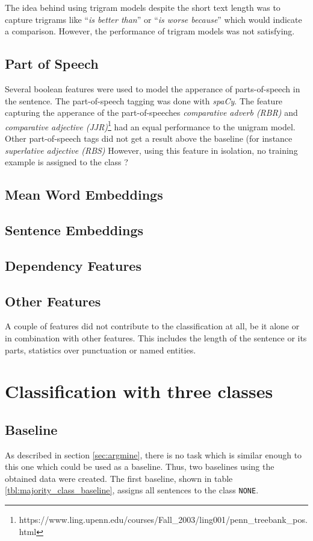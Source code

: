 The idea behind using trigram models despite the short text length was to capture trigrams like \enquote{\emph{is better than}} or \enquote{\emph{is worse because}} which would indicate a comparison. However, the performance of trigram models was not satisfying.
\label{sec:ngrams}

\subsection{Part of Speech}
Several boolean features were used to model the apperance of parts-of-speech in the sentence. The part-of-speech tagging was done with \emph{spaCy}. The feature capturing the apperance of the part-of-speeches \emph{comparative adverb (RBR)} and \emph{comparative adjective (JJR)}\footnote{https://www.ling.upenn.edu/courses/Fall\_2003/ling001/penn\_treebank\_pos.html} had an equal performance to the unigram model. Other part-of-speech tags did not get a result above the baseline (for instance \emph{superlative adjective (RBS)} However, using this feature in isolation, no training example is assigned to the class ?

\subsection{Mean Word Embeddings}

\subsection{Sentence Embeddings}
\subsection{Dependency Features}
\subsection{Other Features}
A couple of features did not contribute to the classification at all, be it alone or in combination with other features. This includes the length of the sentence or its parts, statistics over punctuation or named entities.

\section{Classification with three classes}
\subsection{Baseline}
\label{sec:baseline}
As described in section \ref{sec:argmine}, there is no task which is similar enough to this one which could be used as a baseline. Thus, two baselines using the obtained data were created. The first baseline, shown in table \ref{tbl:majority_class_baseline}, assigns all sentences to the class \texttt{NONE}.



